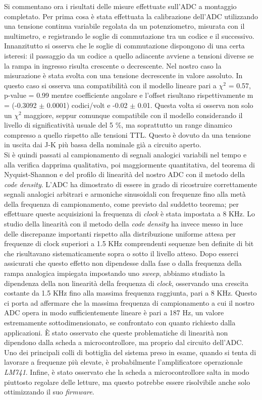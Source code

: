 \documentclass[journal]{IEEEtran}
\begin{document}
Si commentano ora i risultati delle misure effettuate sull'ADC a montaggio completato. Per prima cosa è stata effettuata la calibrazione dell'ADC utilizzando una tensione continua variabile regolata da un potenziometro, misurata con il multimetro, e registrando le soglie di commutazione tra un codice e il successivo. Innanzitutto si osserva che le soglie di commutazione dispongono di una certa isteresi: il passaggio da un codice a quello adiacente avviene a tensioni diverse se la rampa in ingresso risulta crescente o decrescente. Nel nostro caso la misurazione è stata svolta con una tensione decrescente in valore assoluto. In questo caso si osserva una compatibilità con il modello lineare pari a $\chi^2$ = 0.57, p-value = 0.99 mentre coefficiente angolare e l'offset risultano rispettivamente m = (-0.3092 $\pm$ 0.0001) codici/volt e -0.02 $\pm$ 0.01. Questa volta si osserva non solo un $\chi^2$ maggiore, seppur comunque compatibile con il modello considerando il livello di significatività usuale del 5 \%, ma soprattutto un range dinamico compresso a quello rispetto alle tensioni TTL. Questo è dovuto da una tensione in uscita dai J-K più bassa della nominale già a circuito aperto.
\\

Si è quindi passati al campionamento di segnali analogici variabili nel tempo e alla verifica dapprima qualitativa, poi maggiormente quantitativa, del teorema di Nyquist-Shannon e del profilo di linearità del nostro ADC con il metodo della \textit{code density}. L'ADC ha dimostrato di essere in grado di ricostruire correttamente segnali analogici arbitrari e armoniche sinusoidali con frequenze fino alla metà della frequenza di campionamento, come previsto dal suddetto teorema; per effettuare queste acquisizioni la frequenza di \textit{clock} è stata impostata a 8 KHz. Lo studio della linearità con il metodo della \textit{code density} ha invece messo in luce delle discrepanze importanti rispetto alla distribuzione uniforme attesa per frequenze di clock superiori a 1.5 KHz comprendenti sequenze ben definite di bit che risultavano sistematicamente sopra o sotto il livello atteso. Dopo esserci assicurati che questo effetto non dipendesse dalla fase o dalla frequenza della rampa analogica impiegata impostando uno \textit{sweep}, abbiamo studiato la dipendenza della non linearità della frequenza di \textit{clock}, osservando una crescita costante da 1.5 KHz fino alla massima frequenza raggiunta, pari a 8 KHz. Questo ci porta ad affermare che la massima frequenza di campionamento a cui il nostro ADC opera in modo sufficientemente lineare è pari a 187 Hz, un valore estremamente sottodimensionato, se confrontato con quanto richiesto dalla applicazioni. È stato osservato che queste problematiche di linearità non dipendono dalla scheda a microcontrollore, ma proprio dal circuito dell'ADC. Uno dei principali colli di bottiglia del sistema preso in esame, quando si tenta di lavorare a frequenze più elevate, è probabilmente l'amplificatore operazionale \textit{LM741}. Infine, è stato osservato che la scheda a microcontrollore salta in modo piuttosto regolare delle letture, ma questo potrebbe essere risolvibile anche solo ottimizzando il suo \textit{firmware}.
\\
\end{document}
